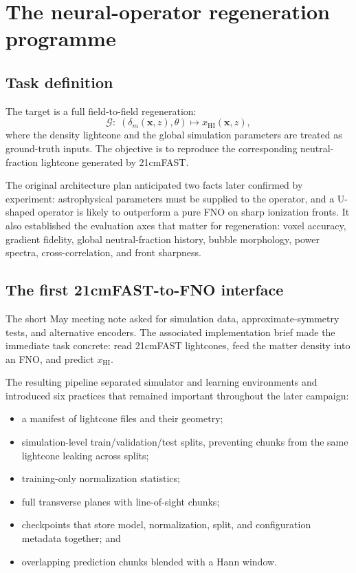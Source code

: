 \documentclass[11pt,a4paper]{article}
\newcommand{\xhi}{x_{\mathrm{HI}}}
\begin{document}
\section{The neural-operator regeneration programme}

\subsection{Task definition}

The target is a full field-to-field regeneration:
\begin{equation}
\mathcal{G}:\;(\delta_m(\mathbf{x},z),\theta)
\longmapsto \xhi(\mathbf{x},z),
\end{equation}
where the density lightcone and the global simulation parameters are treated
as ground-truth inputs. The objective is to reproduce the corresponding
neutral-fraction lightcone generated by 21cmFAST.

The original architecture plan anticipated two facts later confirmed by
experiment:
astrophysical parameters must be supplied to the operator, and a U-shaped
operator is likely to outperform a pure FNO on sharp ionization fronts. It
also established the evaluation axes that matter for regeneration: voxel
accuracy, gradient fidelity, global neutral-fraction history, bubble
morphology, power spectra, cross-correlation, and front sharpness.

\subsection{The first 21cmFAST-to-FNO interface}

The short May meeting note asked for simulation data, approximate-symmetry
tests, and alternative encoders. The associated implementation brief made the
immediate task concrete: read 21cmFAST lightcones, feed the matter density into
an FNO, and predict \(\xhi\).

The resulting pipeline separated simulator and learning environments and
introduced six practices that remained important throughout the later
campaign:
\begin{itemize}
  \item a manifest of lightcone files and their geometry;
  \item simulation-level train/validation/test splits, preventing chunks from
  the same lightcone leaking across splits;
  \item training-only normalization statistics;
  \item full transverse planes with line-of-sight chunks;
  \item checkpoints that store model, normalization, split, and configuration
  metadata together; and
  \item overlapping prediction chunks blended with a Hann window.
\end{itemize}
\end{document}
